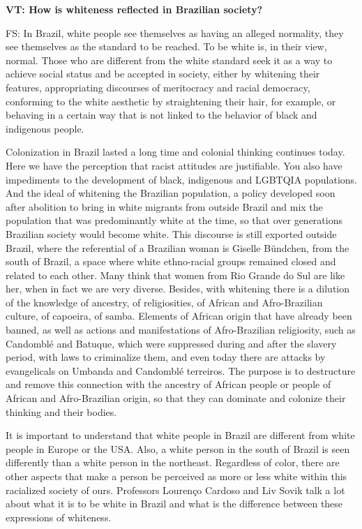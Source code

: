 \documentclass[a4paper,
fontsize=11pt,
oneside,
numbers=noperiodatend,
parskip=half-,
bibliography=totoc,
final
]{scrartcl}
\begin{document}
\textbf{VT: How is whiteness reflected in Brazilian society?}

FS: In Brazil, white people see themselves as having an alleged
normality, they see themselves as the standard to be reached. To be
white is, in their view, normal. Those who are different from the white
standard seek it as a way to achieve social status and be accepted in
society, either by whitening their features, appropriating discourses of
meritocracy and racial democracy, conforming to the white aesthetic by
straightening their hair, for example, or behaving in a certain way that
is not linked to the behavior of black and indigenous people.

Colonization in Brazil lasted a long time and colonial thinking
continues today. Here we have the perception that racist attitudes are
justifiable. You also have impediments to the development of black,
indigenous and LGBTQIA populations. And the ideal of whitening the
Brazilian population, a policy developed soon after abolition to bring
in white migrants from outside Brazil and mix the population that was
predominantly white at the time, so that over generations Brazilian
society would become white. This discourse is still exported outside
Brazil, where the referential of a Brazilian woman is Giselle Bündchen,
from the south of Brazil, a space where white ethno-racial groups
remained closed and related to each other. Many think that women from
Rio Grande do Sul are like her, when in fact we are very diverse.
Besides, with whitening there is a dilution of the knowledge of
ancestry, of religiosities, of African and Afro-Brazilian culture, of
capoeira, of samba. Elements of African origin that have already been
banned, as well as actions and manifestations of Afro-Brazilian
religiosity, such as Candomblé and Batuque, which were suppressed during
and after the slavery period, with laws to criminalize them, and even
today there are attacks by evangelicals on Umbanda and Candomblé
terreiros. The purpose is to destructure and remove this connection with
the ancestry of African people or people of African and Afro-Brazilian
origin, so that they can dominate and colonize their thinking and their
bodies.

It is important to understand that white people in Brazil are different
from white people in Europe or the USA. Also, a white person in the
south of Brazil is seen differently than a white person in the
northeast. Regardless of color, there are other aspects that make a
person be perceived as more or less white within this racialized society
of ours. Professors Lourenço Cardoso and Liv Sovik talk a lot about what
it is to be white in Brazil and what is the difference between these
expressions of whiteness.
\end{document}
